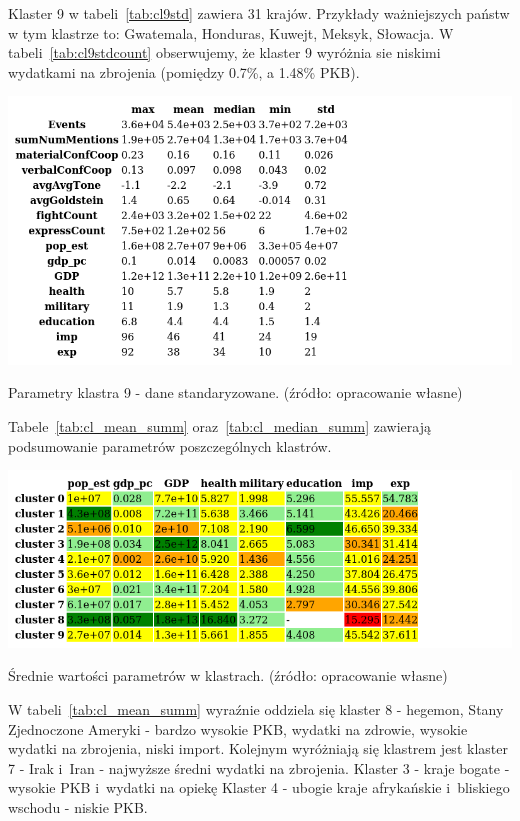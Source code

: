 \documentclass[11pt]{report}
\begin{document}
    Klaster 9 w tabeli~\ref{tab:cl9std} zawiera 31 krajów.
    Przykłady ważniejszych państw w tym klastrze to: Gwatemala, Honduras, Kuwejt, Meksyk, Słowacja.
    W tabeli~\ref{tab:cl9stdcount} obserwujemy, że klaster 9 wyróżnia sie niskimi wydatkami na zbrojenia (pomiędzy 0.7\%, a 1.48\% PKB).

    \begin{table}[!htp]
        \centering
        \includegraphics[width=\linewidth]{tables/CLUST/desc/clust9std_desc.png}
        \caption{Parametry klastra 9 - dane standaryzowane. (źródło: opracowanie własne)}
        \label{tab:cl9std_desc}
    \end{table}

    Tabele~\ref{tab:cl_mean_summ} oraz~\ref{tab:cl_median_summ} zawierają podsumowanie parametrów poszczególnych klastrów.

    \begin{table}[!htp]
        \centering
        \includegraphics[width=\linewidth]{tables/CLUST/desc/cluster_mean_summary.png}
        \caption{Średnie wartości parametrów w klastrach. (źródło: opracowanie własne)}
        \label{tab:cl_mean_summ}
    \end{table}

    W tabeli~\ref{tab:cl_mean_summ} wyraźnie oddziela się klaster 8 - hegemon, Stany Zjednoczone Ameryki - bardzo wysokie PKB, wydatki na zdrowie, wysokie wydatki na zbrojenia, niski import.
    Kolejnym wyróżniają się klastrem jest klaster 7 - Irak i~Iran - najwyższe średni wydatki na zbrojenia.
    Klaster 3 - kraje bogate - wysokie PKB i~wydatki na opiekę
    Klaster 4 - ubogie kraje afrykańskie i~bliskiego wschodu - niskie PKB.
\end{document}
